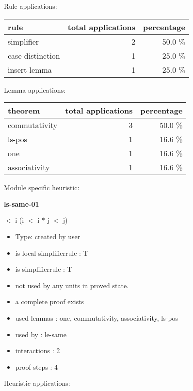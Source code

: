 \documentclass[a4paper]{article}
\begin{document}
Rule applications:

\begin{supertabular}{l|r|r}
rule	        & total applications & percentage \\ \hline
simplifier & 2 & 50.0 \% \\
case distinction & 1 & 25.0 \% \\
insert lemma & 1 & 25.0 \% \\

\end{supertabular}

Lemma applications:

\begin{supertabular}{l|r|r}
theorem	        & total applications & percentage \\ \hline
commutativity & 3 & 50.0 \% \\
ls-pos & 1 & 16.6 \% \\
one & 1 & 16.6 \% \\
associativity & 1 & 16.6 \% \\

\end{supertabular}

Module specific heuristic:

\pagebreak

{\LARGE\bf ls-same-01}\label{lemma-ls-same-01}

\medskip

  $<$ i \Imp (i $<$ i $*$ j  $<$ j)

\begin{itemize}

\item Type: created by user

\item is local simplifierrule : T
\item is simplifierrule : T
\item not used by any units in proved state.
\item       a complete proof exists
\item       used lemmas  : one, commutativity, associativity, ls-pos
\item       used by      : le-same
\item       interactions : 2
\item       proof steps  : 4
\end{itemize}

\medskip


Heuristic applications:
\end{document}

